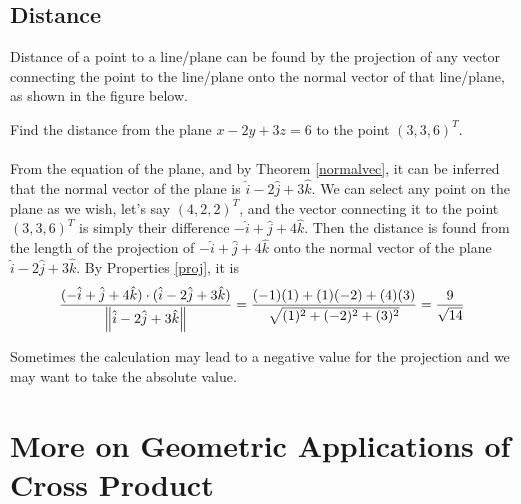 \subsection{Distance} Distance of a point to a line/plane can be found by the projection of any vector connecting the point to the line/plane onto the normal vector of that line/plane, as shown in the figure below.
\begin{center}
\end{center}

\begin{exmp}
Find the distance from the plane $x-2y+3z = 6$ to the point $(3,3,6)^T$.\\
\\
From the equation of the plane, and by Theorem \ref{normalvec}, it can be inferred that the normal vector of the plane is $\hat{i} - 2\hat{j} + 3\hat{k}$. We can select any point on the plane as we wish, let's say $(4,2,2)^T$, and the vector connecting it to the point $(3,3,6)^T$ is simply their difference $-\hat{i} + \hat{j} + 4\hat{k}$. Then the distance is found from the length of the projection of $-\hat{i} + \hat{j} + 4\hat{k}$ onto the normal vector of the plane $\hat{i} - 2\hat{j} + 3\hat{k}$. By Properties \ref{proj}, it is
\begin{align*}
\frac{(-\hat{i} + \hat{j} + 4\hat{k}) \cdot (\hat{i} - 2\hat{j} + 3\hat{k})}{\norm{\hat{i} - 2\hat{j} + 3\hat{k}}} = \frac{(-1)(1)+(1)(-2)+(4)(3)}{\sqrt{(1)^2 + (-2)^2 + (3)^2}} = \frac{9}{\sqrt{14}}
\end{align*}
\end{exmp}
Sometimes the calculation may lead to a negative value for the projection and we may want to take the absolute value.

\section{More on Geometric Applications of Cross Product}
